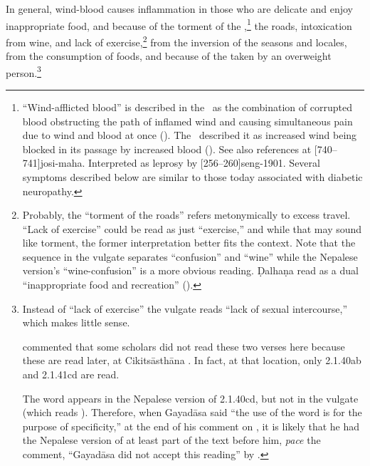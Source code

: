 \begin{translation}
In general, wind-blood causes 
inflammation
in those who are delicate and enjoy inappropriate food, and because of
the torment of the
,\footnote{\label{ni1:vatarakta}“Wind-afflicted blood” is
    described in the \SS\  as the combination of corrupted blood
    obstructing the path of inflamed wind and causing simultaneous pain
    due to wind and blood at once ().  The \CS\ described
    it as increased wind being blocked in its passage by increased blood
    ().  See also references at
    [740--741]{josi-maha}.  Interpreted as leprosy by
    [256--260]{seng-1901}.  Several symptoms described below
    are similar to those today associated with diabetic neuropathy.} the
    roads, intoxication from wine, and lack of
    exercise,\footnote{Probably, the “torment of the roads” refers
        metonymically to excess travel. “Lack of exercise” could be read as
        just “exercise,” and while that may sound like torment, the former
        interpretation better fits the context.  Note that the sequence
         in the vulgate separates “confusion” and “wine”
        while the Nepalese version's “wine-confusion” is a more obvious
        reading.  Ḍalhaṇa read  as a dual
        “inappropriate food and recreation” ().} from the inversion of the seasons and locales, from the
        consumption of  foods, and because of the
         taken by an overweight
        person.\footnote{Instead of “lack of exercise” the vulgate reads “lack
            of sexual intercourse,” which makes little sense.
            
    \label{2.1.40} commented that some scholars 
    did not read
    these two verses here because these are read later, at Cikitsāsthāna
    .  In fact, at that location, only 2.1.40ab and
    2.1.41cd are read.
                
    The word  appears in the Nepalese version of 2.1.40cd,
but not in the vulgate (which reads ). Therefore, when
Gayadāsa said  “the use of the
word  is for the purpose of specificity,” at the end of
his comment on , it is likely that
he had the Nepalese version of at least part of the text before
him, \emph{pace} the comment, “Gayadāsa did not accept this
reading” by \citet[][263, note
2]{vulgate}.}



\end{translation}
